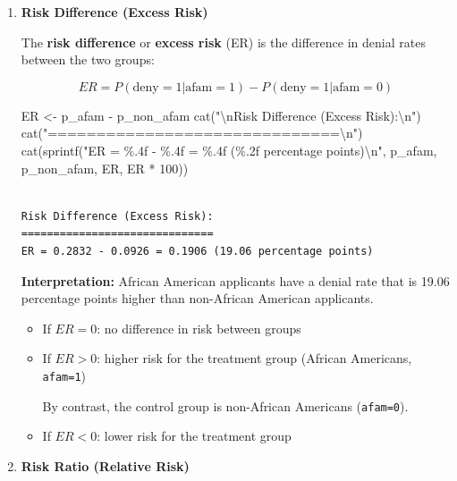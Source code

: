 \documentclass[
  12pt,
  letterpaper,
]{scrbook}
\newenvironment{Shaded}{\begin{snugshade}}{\end{snugshade}}
\newcommand{\DecValTok}[1]{\textcolor[rgb]{0.68,0.00,0.00}{#1}}
\newcommand{\FunctionTok}[1]{\textcolor[rgb]{0.28,0.35,0.67}{#1}}
\newcommand{\NormalTok}[1]{\textcolor[rgb]{0.00,0.23,0.31}{#1}}
\newcommand{\OtherTok}[1]{\textcolor[rgb]{0.00,0.23,0.31}{#1}}
\newcommand{\SpecialCharTok}[1]{\textcolor[rgb]{0.37,0.37,0.37}{#1}}
\newcommand{\StringTok}[1]{\textcolor[rgb]{0.13,0.47,0.30}{#1}}
\theoremstyle{plain}
\theoremstyle{definition}
\theoremstyle{remark}
\begin{document}
\begin{enumerate}
\def\labelenumi{\arabic{enumi}.}
\item
  \textbf{Risk Difference (Excess Risk)}

  The \textbf{risk difference} or \textbf{excess risk} (ER) is the
  difference in denial rates between the two groups:

  \[
  ER = P(\text{deny}=1|\text{afam}=1) - P(\text{deny}=1|\text{afam}=0)
  \]

\begin{Shaded}
\begin{Highlighting}[]
\NormalTok{ER }\OtherTok{\textless{}{-}}\NormalTok{ p\_afam }\SpecialCharTok{{-}}\NormalTok{ p\_non\_afam}
\FunctionTok{cat}\NormalTok{(}\StringTok{"}\SpecialCharTok{\textbackslash{}n}\StringTok{Risk Difference (Excess Risk):}\SpecialCharTok{\textbackslash{}n}\StringTok{"}\NormalTok{)}
\FunctionTok{cat}\NormalTok{(}\StringTok{"==============================}\SpecialCharTok{\textbackslash{}n}\StringTok{"}\NormalTok{)}
\FunctionTok{cat}\NormalTok{(}\FunctionTok{sprintf}\NormalTok{(}\StringTok{"ER = \%.4f {-} \%.4f = \%.4f (\%.2f percentage points)}\SpecialCharTok{\textbackslash{}n}\StringTok{"}\NormalTok{, p\_afam, p\_non\_afam, ER, ER }\SpecialCharTok{*} \DecValTok{100}\NormalTok{))}
\end{Highlighting}
\end{Shaded}

\begin{verbatim}

Risk Difference (Excess Risk):
==============================
ER = 0.2832 - 0.0926 = 0.1906 (19.06 percentage points)
\end{verbatim}

  \textbf{Interpretation:} African American applicants have a denial
  rate that is 19.06 percentage points higher than non-African American
  applicants.

  \begin{itemize}
  \item
    If \(ER = 0\): no difference in risk between groups
  \item
    If \(ER > 0\): higher risk for the {treatment group} (African
    Americans, \texttt{afam=1})

    By contrast, the {control group} is non-African Americans
    (\texttt{afam=0}).
  \item
    If \(ER < 0\): lower risk for the treatment group
  \end{itemize}
\item
  \textbf{Risk Ratio (Relative Risk)}


\end{enumerate}
\end{document}
